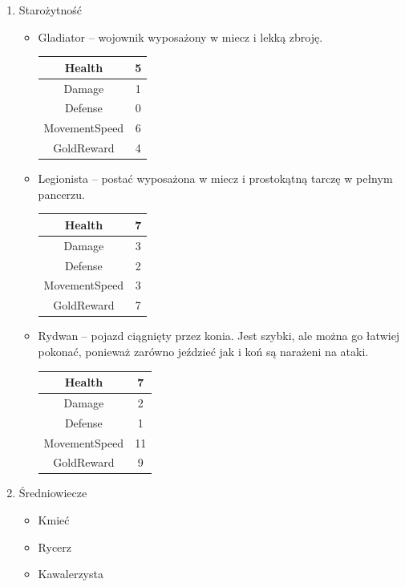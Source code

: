 \documentclass[a4paper,12pt, twoside, titlepage]{article}
\begin{document}
\begin{enumerate}
	\item Starożytność
	\begin{itemize} 
		\item Gladiator -- wojownik wyposażony w miecz i lekką zbroję.
		\begin{longtable}[l]{|c|c|} 
			\hline
			Health & 5 \\
			\hline
			Damage & 1 \\ 
			\hline 
			Defense & 0 \\ 
			\hline
			MovementSpeed & 6 \\ 
			\hline
			GoldReward & 4 \\ 
			\hline
		\end{longtable}
		\newpage
		\item Legionista -- postać wyposażona w miecz i prostokątną tarczę w pełnym pancerzu.
		\begin{longtable}[l]{|c|c|} 
			\hline
			Health & 7 \\
			\hline
			Damage & 3 \\ 
			\hline 
			Defense & 2 \\ 
			\hline
			MovementSpeed & 3 \\ 
			\hline
			GoldReward & 7 \\ 
			\hline
		\end{longtable}
		
		\item Rydwan -- pojazd ciągnięty przez konia. Jest szybki, ale można go łatwiej pokonać, ponieważ zarówno jeździeć jak i koń są narażeni na ataki.
		\begin{longtable}[l]{|c|c|} 
			\hline
			Health & 7 \\
			\hline
			Damage & 2 \\ 
			\hline 
			Defense & 1 \\ 
			\hline
			MovementSpeed & 11 \\ 
			\hline
			GoldReward & 9 \\ 
			\hline
		\end{longtable}
	\end{itemize}
	
	\item Średniowiecze
	\begin{itemize}
		\item Kmieć
		
		\item Rycerz
	
		\item Kawalerzysta
	\end{itemize}
\end{enumerate}
\end{document}
